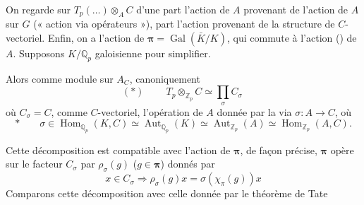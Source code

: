 \documentclass[11pt,a4paper]{article}
\begin{document}


On regarde sur $T_p(\ldots) \otimes_A C$ d'une part l'action de $A$ provenant
de l'action de $A$ sur $G$ (« action via opérateurs »), 
part l'action provenant de la structure de $C$-vectoriel. Enfin, on a
l'action de $\boldsymbol{\pi} = \operatorname{Gal}(\bar{K}/K)$, qui commute à
l'action () de $A$. Supposons $K/\mathbb{Q}_p$
galoisienne pour simplifier.


Alors comme module sur $A_C$, 
canoniquement
\[
(*) \qquad \boxed{\ T_p \otimes_{\mathbb{Z}_p} C \simeq \prod_\sigma C_\sigma\ }
\]
où $C_\sigma = C$, comme $C$-vectoriel, l'opération de $A$ donnée par la
 via $\sigma : A \to C$, où
\[
* \qquad \sigma \in \operatorname{Hom}_{\mathbb{Q}_p}(K, C) \simeq \operatorname{Aut}_{\mathbb{Q}_p}(K) \simeq \operatorname{Aut}_{\mathbb{Z}_p}(A) \simeq \operatorname{Hom}_{\mathbb{Z}_p}(A, C).
\]

Cette décomposition est compatible avec l'action de $\boldsymbol{\pi}$, de
façon précise, $\boldsymbol{\pi}$ opère sur le facteur $C_\sigma$ par
$\rho_\sigma(g)$ ($g \in \boldsymbol{\pi}$) donnés par
\[
x \in C_\sigma \Rightarrow \rho_\sigma(g) x = \sigma(\chi_\pi(g)) x
\]
Comparons cette décomposition avec celle donnée par le théorème de Tate

\end{document}
